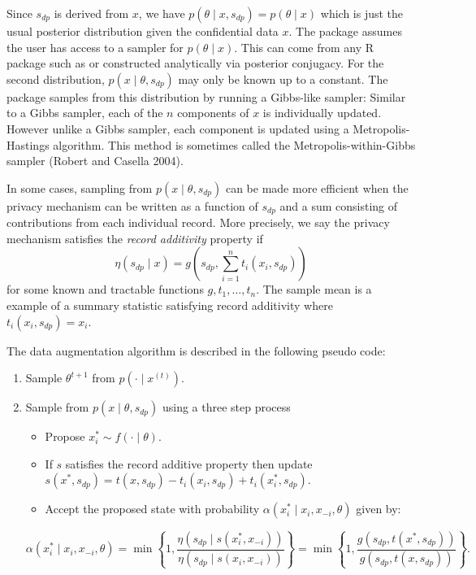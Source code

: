 Since \(s_{dp}\) is derived from \(x\), we have \(p(\theta \mid x, s_{dp}) = p(\theta \mid x)\) which
is just the usual posterior distribution given the confidential data \(x\). The 
package assumes the user has access to a sampler for \(p(\theta \mid x)\). This can
come from any R package such as  or constructed analytically via posterior conjugacy.
For the second distribution, \(p(x \mid \theta, s_{dp})\) may
only be known up to a constant. The  package samples from this distribution by
running a Gibbs-like sampler: Similar to a Gibbs sampler, each of the \(n\) components of \(x\) is individually
updated. However unlike a Gibbs sampler, each component is updated
using a Metropolis-Hastings algorithm. This method is sometimes called the Metropolis-within-Gibbs sampler (Robert and Casella 2004).

In some cases, sampling from \(p(x \mid \theta, s_{dp})\) can be made more efficient
when the privacy mechanism can be written as a function of \(s_{dp}\) and
a sum consisting of contributions from each individual record. More precisely, we say the privacy mechanism satisfies
the \emph{record additivity} property if
\[
\eta(s_{dp} \mid x) = g\left(s_{dp}, \sum_{i=1}^{n}t_i(x_i, s_{dp}) \right)
\]
for some known and tractable functions \(g, t_1, \ldots, t_n\). The sample mean is a
example of a summary statistic satisfying record additivity where \(t_i(x_i, s_{dp}) = x_i\).

The data augmentation algorithm is described in the following pseudo code:

\begin{enumerate}
\def\labelenumi{\arabic{enumi}.}
\tightlist
\item
  Sample \(\theta^{t+1}\) from \(p(\cdot \mid x^{(t)})\).
\item
  Sample from \(p(x \mid \theta, s_{dp})\) using a three step process

  \begin{itemize}
  \tightlist
  \item
    Propose \(x_{i}^{*} \sim f(\cdot \mid \theta)\).
  \item
    If \(s\) satisfies the record additive property then
    update \(s(x^*, s_{dp}) = t(x,s_{dp}) - t_i(x_i,s_{dp}) + t_{i}(x_i^*, s_{dp})\).
  \item
    Accept the proposed state with probability \(\alpha(x_i^* \mid x_i, x_{-i}, \theta)\)
    given by:
  \end{itemize}

  \[
     \alpha(x_i^* \mid x_i, x_{-i}, \theta) = \min \left\{ 1, \dfrac{\eta(s_{dp} \mid s(x_i^*, x_{-i}))}{\eta(s_{dp} \mid s(x_i, x_{-i}))} \right\}  
     = \min \left\{ 1, \dfrac{g(s_{dp}, t(x^*, s_{dp}))}{g(s_{dp}, t(x,s_{dp}))} \right\}.
   \]
\end{enumerate}

